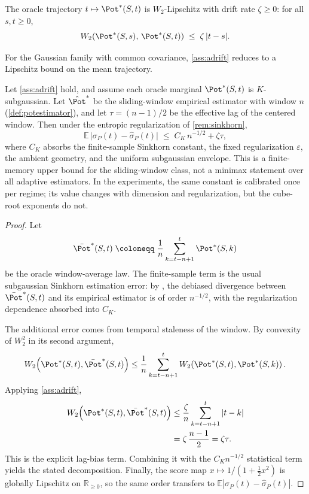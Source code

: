 \begin{assumption}\label{ass:adrift}
The oracle trajectory $t \mapsto \Pot^*(S,t)$ is $W_2$-Lipschitz with drift
rate $\zeta \geq 0$: for all $s,t \geq 0$,
\[
  W_2\!\left(\Pot^*(S,s),\,\Pot^*(S,t)\right)
  \;\leq\; \zeta\,|t-s|.
\]
\end{assumption}

For the Gaussian family with common covariance, \cref{ass:adrift} reduces to a
Lipschitz bound on the mean trajectory.

\begin{proposition}%
\label{prop:tci_estimation_error}
Let \cref{ass:adrift} hold, and assume each oracle marginal $\Pot^*(S,t)$ is
$K$-subgaussian. Let $\hat\Pot^*$ be the sliding-window empirical estimator
with window $n$ (\cref{def:potestimator}), and let
$\tau = (n-1)/2$ be the effective lag of the centered window.
Then under the entropic regularization of \cref{rem:sinkhorn},
\[
  \mathbb{E}\,\bigl|\sigma_P(t) - \hat\sigma_P(t)\bigr|
  \;\leq\;
  C_K\,n^{-1/2} + \zeta\tau,
\]
where $C_K$ absorbs the finite-sample Sinkhorn constant, the fixed
regularization $\varepsilon$, the ambient geometry, and the uniform subgaussian
envelope. This is a finite-memory upper bound for the sliding-window class, not
a minimax statement over all adaptive estimators.
In the experiments, the same constant is calibrated once per regime; its value
changes with dimension and regularization, but the cube-root exponents do not.
\end{proposition}

\begin{proof}
Let
\[
  \bar\Pot^*(S,t)
  \;\coloneqq\;
  \frac{1}{n}\sum_{k=t-n+1}^{t}\Pot^*(S,k)
\]
be the oracle window-average law. The finite-sample term is the usual
subgaussian Sinkhorn estimation error: by \citet[Thm.~3]{GenevayEtAl2019}, the
debiased divergence between $\bar\Pot^*(S,t)$ and its empirical estimator is of
order $n^{-1/2}$, with the regularization dependence absorbed into $C_K$.

The additional error comes from temporal staleness of the window. By convexity
of $W_2^2$ in its second argument,
\[
  W_2\!\left(\Pot^*(S,t),\bar\Pot^*(S,t)\right)
  \leq
  \frac{1}{n}\sum_{k=t-n+1}^{t}
  W_2\!\left(\Pot^*(S,t),\Pot^*(S,k)\right).
\]
Applying \cref{ass:adrift},
\begin{align*}
  W_2\!\left(\Pot^*(S,t),\bar\Pot^*(S,t)\right)
  &\leq \frac{\zeta}{n}\sum_{k=t-n+1}^{t}|t-k| \\
  &= \zeta\,\frac{n-1}{2}
   = \zeta\tau.
\end{align*}
This is the explicit lag-bias term. Combining it with the
$C_K n^{-1/2}$ statistical term yields the stated decomposition. Finally, the
score map $x \mapsto 1/(1+\tfrac{1}{2}x^2)$ is globally Lipschitz on
$\mathbb{R}_{\geq 0}$, so the same order transfers to
$\mathbb{E}|\sigma_P(t)-\hat\sigma_P(t)|$.
\end{proof}

